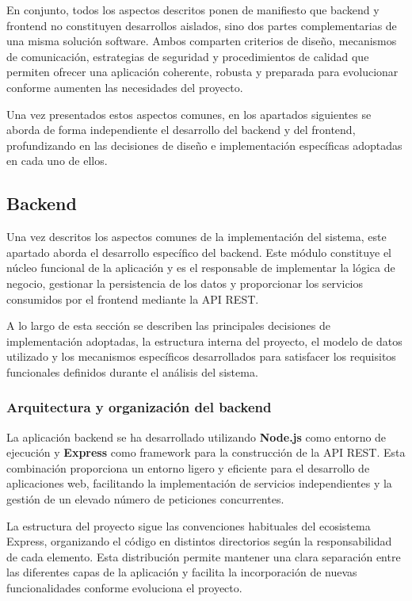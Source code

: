En conjunto, todos los aspectos descritos ponen de manifiesto que backend y frontend no constituyen desarrollos aislados, sino dos partes complementarias de una misma solución software. Ambos comparten criterios de diseño, mecanismos de comunicación, estrategias de seguridad y procedimientos de calidad que permiten ofrecer una aplicación coherente, robusta y preparada para evolucionar conforme aumenten las necesidades del proyecto.

Una vez presentados estos aspectos comunes, en los apartados siguientes se aborda de forma independiente el desarrollo del backend y del frontend, profundizando en las decisiones de diseño e implementación específicas adoptadas en cada uno de ellos.

\subsection{Backend}
\label{subsec:backend}

Una vez descritos los aspectos comunes de la implementación del sistema, este apartado aborda el desarrollo específico del backend. Este módulo constituye el núcleo funcional de la aplicación y es el responsable de implementar la lógica de negocio, gestionar la persistencia de los datos y proporcionar los servicios consumidos por el frontend mediante la API REST.

A lo largo de esta sección se describen las principales decisiones de implementación adoptadas, la estructura interna del proyecto, el modelo de datos utilizado y los mecanismos específicos desarrollados para satisfacer los requisitos funcionales definidos durante el análisis del sistema.

\subsubsection{Arquitectura y organización del backend}

La aplicación backend se ha desarrollado utilizando \textbf{Node.js} como entorno de ejecución y \textbf{Express} como framework para la construcción de la API REST. Esta combinación proporciona un entorno ligero y eficiente para el desarrollo de aplicaciones web, facilitando la implementación de servicios independientes y la gestión de un elevado número de peticiones concurrentes.

La estructura del proyecto sigue las convenciones habituales del ecosistema Express, organizando el código en distintos directorios según la responsabilidad de cada elemento. Esta distribución permite mantener una clara separación entre las diferentes capas de la aplicación y facilita la incorporación de nuevas funcionalidades conforme evoluciona el proyecto.

